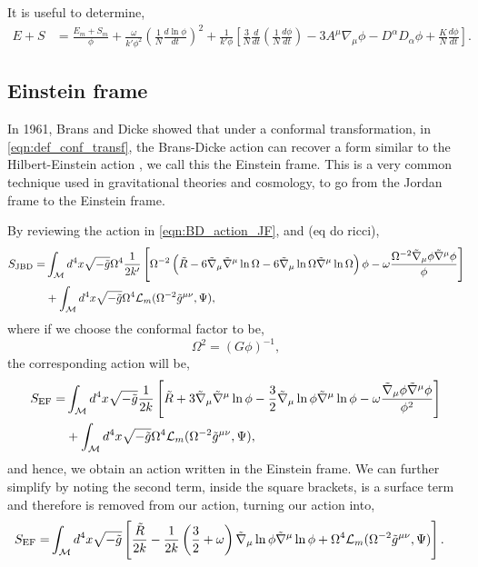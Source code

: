 It is useful to determine,
\begin{align}
    E+S&=\frac{E_m+S_m}{\phi}+\frac{\omega}{k'\phi^2}\left(\frac{1}{N}\frac{d\ln\phi}{dt}\right)^2+\frac{1}{k'\phi}\left[\frac{3}{N}\frac{d}{dt}\left(\frac{1}{N}\frac{d\phi}{dt}\right)-3A^\mu\nabla_\mu\phi-D^\alpha D_\alpha\phi+\frac{K}{N}\frac{d\phi}{dt}\right].
    \label{eqn:raych_useful}
\end{align}



\subsection{Einstein frame}

In 1961, Brans and Dicke showed that under a conformal transformation, in \cref{eqn:def_conf_transf}, the Brans-Dicke action can recover a form similar to the Hilbert-Einstein action \cite{Brans_1961}, we call this the Einstein frame. This is a very common technique used in gravitational theories and cosmology, to go from the Jordan frame to the Einstein frame.


By reviewing the action in \cref{eqn:BD_action_JF}, and (eq do ricci),
\begin{align}
    S_{\text{JBD}}=&\int_{\mathcal{M}} d^4x\sqrt{-\Tilde{g}}\Omega^4\frac{1}{2k'}\left[\Omega^{-2}\left(\Tilde{R}-6\Tilde{\nabla}_\mu\Tilde{\nabla}^\mu\ln\Omega-6\Tilde{\nabla}_\mu\ln\Omega\Tilde{\nabla}^\mu\ln\Omega\right)\phi-\omega \frac{\Omega^{-2}\Tilde{\nabla}_\mu\phi\Tilde{\nabla}^\mu\phi}{\phi}\right]\nonumber\\
    &+\int_{\mathcal{M}} d^4x\sqrt{-\Tilde{g}}\Omega^4\mathcal{L}_m(\Omega^{-2}\Tilde{g}^{\mu\nu},\Psi),
    \label{eqn:bd_ef_1}
\end{align}
where if we choose the conformal factor to be,
\begin{equation}
    \Omega^2=(G\phi)^{-1},
\end{equation}
the corresponding action will be,
\begin{align}
    S_{\text{EF}}=&\int_{\mathcal{M}} d^4x\sqrt{-\Tilde{g}}\frac{1}{2k}\left[\Tilde{R}+3\Tilde{\nabla}_\mu\Tilde{\nabla}^\mu\ln\phi-\frac{3}{2}\Tilde{\nabla}_\mu\ln\phi\Tilde{\nabla}^\mu\ln\phi-\omega \frac{\Tilde{\nabla}_\mu\phi\Tilde{\nabla}^\mu\phi}{\phi^2}\right]\nonumber\\
    &+\int_{\mathcal{M}} d^4x\sqrt{-\Tilde{g}}\Omega^4\mathcal{L}_m(\Omega^{-2}\Tilde{g}^{\mu\nu},\Psi),
    \label{eqn:bd_ef_2}
\end{align}
and hence, we obtain an action written in the Einstein frame. We can further simplify by noting the second term, inside the square brackets, is a surface term and therefore is removed from our action, turning our action into,
\begin{align}
    S_{\text{EF}}=&\int_{\mathcal{M}} d^4x\sqrt{-\Tilde{g}}\left[\frac{\Tilde{R}}{2k}-\frac{1}{2k}\left(\frac{3}{2}+\omega\right)\Tilde{\nabla}_\mu\ln\phi\Tilde{\nabla}^\mu\ln\phi+\Omega^4\mathcal{L}_m(\Omega^{-2}\Tilde{g}^{\mu\nu},\Psi)\right].
    \label{eqn:bd_ef_3}
\end{align}

